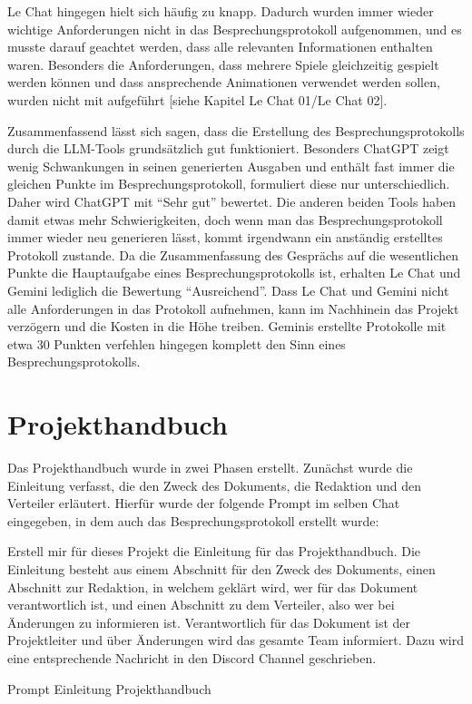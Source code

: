 Le Chat hingegen hielt sich häufig zu knapp. Dadurch wurden immer wieder wichtige Anforderungen nicht in das 
Besprechungsprotokoll aufgenommen, und es musste darauf geachtet werden, dass alle relevanten Informationen enthalten 
waren. Besonders die Anforderungen, dass mehrere Spiele gleichzeitig gespielt werden können und dass ansprechende 
Animationen verwendet werden sollen, wurden nicht mit aufgeführt [siehe Kapitel Le Chat 01/Le Chat 02].

Zusammenfassend lässt sich sagen, dass die Erstellung des Besprechungsprotokolls durch die LLM-Tools grundsätzlich 
gut funktioniert. Besonders ChatGPT zeigt wenig Schwankungen in seinen generierten Ausgaben und enthält fast immer 
die gleichen Punkte im Besprechungsprotokoll, formuliert diese nur unterschiedlich. Daher wird ChatGPT mit 
``Sehr gut'' bewertet. Die anderen beiden Tools haben damit etwas mehr Schwierigkeiten, doch wenn man das 
Besprechungsprotokoll immer wieder neu generieren lässt, kommt irgendwann ein anständig erstelltes Protokoll 
zustande. Da die Zusammenfassung des Gesprächs auf die wesentlichen Punkte die Hauptaufgabe eines Besprechungsprotokolls 
ist, erhalten Le Chat und Gemini lediglich die Bewertung ``Ausreichend''. Dass Le Chat und Gemini nicht alle Anforderungen 
in das Protokoll aufnehmen, kann im Nachhinein das Projekt verzögern und die Kosten in die Höhe treiben. Geminis 
erstellte Protokolle mit etwa 30 Punkten verfehlen hingegen komplett den Sinn eines Besprechungsprotokolls.

\section{Projekthandbuch}  \label{CompProjekthandbuch}

Das Projekthandbuch wurde in zwei Phasen erstellt. Zunächst wurde die Einleitung verfasst, die den Zweck des 
Dokuments, die Redaktion und den Verteiler erläutert. Hierfür wurde der folgende Prompt im selben Chat eingegeben, 
in dem auch das Besprechungsprotokoll erstellt wurde:

\begin{prompt}[H]
    \begin{tcolorbox}[colback=gray!20, colframe=gray!20, boxrule=0pt, sharp corners]
        Erstell mir für dieses Projekt die Einleitung für das Projekthandbuch. Die Einleitung besteht aus einem 
        Abschnitt für den Zweck des Dokuments, einen Abschnitt zur Redaktion, in welchem geklärt wird, wer für das 
        Dokument verantwortlich ist, und einen Abschnitt zu dem Verteiler, also wer bei Änderungen zu informieren ist. 
        Verantwortlich für das Dokument ist der Projektleiter und über Änderungen wird das gesamte Team informiert. 
        Dazu wird eine entsprechende Nachricht in den Discord Channel geschrieben.
        \vfill
    \end{tcolorbox}
    \caption{Prompt Einleitung Projekthandbuch}
    \label{Prompt Einleitung Projekthandbuch}
\end{prompt}


